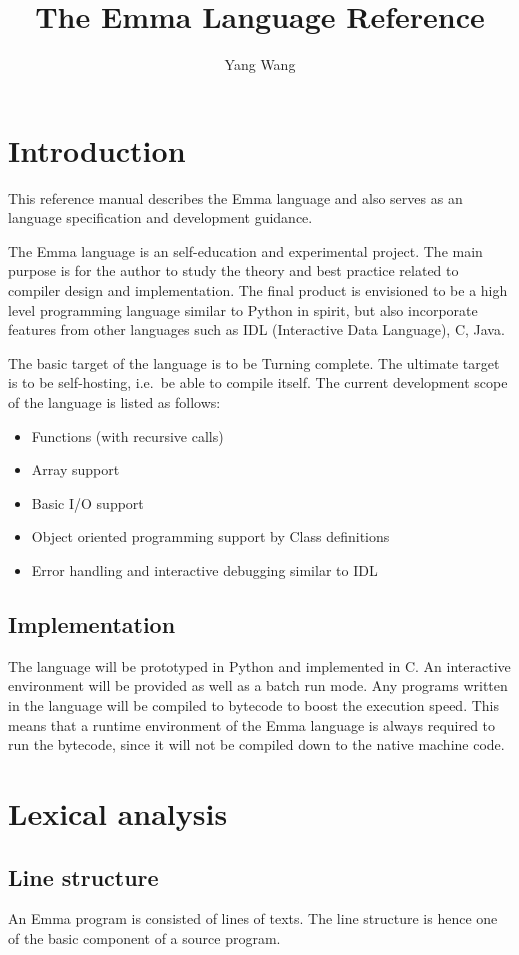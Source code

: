 \documentclass[10pt,a4paper]{article}
\author{Yang Wang}
\title{The Emma Language Reference}
\begin{document}
\section{Introduction}
This reference manual describes the Emma language and also serves as an  
language specification and development guidance.

The Emma language is an self-education and experimental project. 
The main purpose is for the author to study the theory and best practice related
to compiler design and implementation. 
The final product is envisioned to be a high level programming language similar
to Python in spirit, but also incorporate features from other languages such as
IDL (Interactive Data Language), C, Java. 

The basic target of the language is to be Turning complete. The ultimate
target is to be self-hosting, i.e.\ be able to compile itself.
The current development scope of the language is listed as follows:

\begin{itemize}
\item Functions (with recursive calls)
\item Array support
\item Basic I/O support
\item Object oriented programming support by Class definitions
\item Error handling and interactive debugging similar to IDL
\end{itemize}


\subsection{Implementation}
The language will be prototyped in Python and implemented in C. 
An interactive environment will be provided as well as a batch
run mode. Any programs written in the language will be compiled
to bytecode to boost the execution speed. This means
that a runtime environment of the Emma language is always required to run
the bytecode, since it will not be compiled down to the native machine
code.

\pagebreak

\section{Lexical analysis}
\subsection{Line structure}
An Emma program is consisted of lines of texts. The line structure is
hence one of the basic component of a source program.
\end{document}
